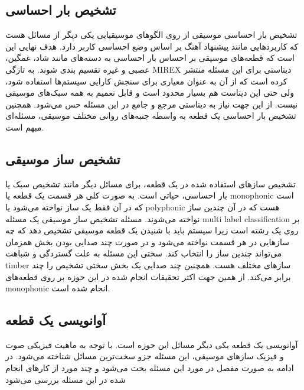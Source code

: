 \subsection{تشخیص بار احساسی}
تشخیص بار احساسی موسیقی از روی الگوهای موسیقیایی یکی دیگر از مسائل هست که
کاربردهایی مانند پیشنهاد آهنگ بر اساس وضع احساسی کاربر دارد. هدف نهایی این است
که قطعه‌های موسیقی بر احساس بار احساسی به دسته‌های مانند شاد، غمگین، عصبی و غیره
تقسیم بندی شوند. به تازگی MIREX دیتاستی برای این مسئله منتشر کرده است که از آن
به عنوان معیاری برای سنجش کارایی سیستم‌ها استفاده شود، ولی حتی این دیتاست هم
بسیار محدود است و قابل تعمیم به همه سبک‌های موسیقی نیست. از این جهت نیاز به
دیتاستی مرجع و جامع در این مسئله حس می‌شود. همچنین تشخیص بار احساسی یک قطعه به
واسطه جنبه‌های روانی مختلف موسیقی، مسئله‌ای مبهم است.

\subsection{تشخیص ساز موسیقی}
تشخیص سازهای استفاده شده در یک قطعه، برای مسائل دیگر مانند تشخیص سبک یا بار
احساسی، حیاتی است. به صورت کلی هر قسمت یک قطعه یا \gls{monophonic} است که در آن
فقط یک ساز نواخته می‌شود یا \gls{polyphonic} هست که در آن چندین ساز نواخته
می‌شوند. مسئله تشخیص ساز موسیقی یک مسئله \gls{multi label classification} بر روی
یک رشته است زیرا سیستم باید با شنیدن یک قطعه موسیقی تشخیص دهد که چه سازهایی در
هر قسمت نواخته می‌شود و در صورت چند صدایی بودن بخش همزمان می‌تواند چندین ساز را
انتخاب کند. سختی این مسئله به علت گستردگی و شباهت \gls{timber} سازهای مختلف هست.
همچنین چند صدایی یک بخش سختی تشخیص را چند برابر می‌کند. از همین جهت اکثر تحقیقات
انجام شده در این حوزه بر روی قطعه‌های \gls{monophonic} انجام شده است.

\subsection{آوانویسی یک قطعه}
آوانویسی یک قطعه یکی دیگر مسائل این حوزه است. با توجه به ماهیت فیزیکی صوت و
فیزیک سازهای موسیقی، این مسئله جزو سخت‌ترین مسائل شناخته می‌شود. در ادامه به
صورت مفصل در مورد این مسئله بحث می‌شود و چند مورد از کارهای انجام شده در این
مسئله بررسی می‌شود